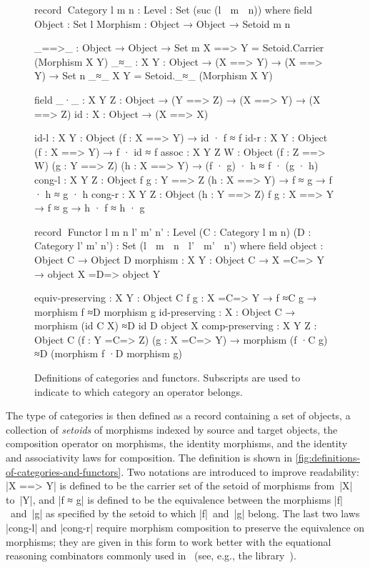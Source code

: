 \begin{figure}
\codefigure\small
\begin{code}
record ^^^Category {l m n : Level} : Set (suc (l ⊔ m ⊔ n)) where
  field
    Object    :  Set l
    Morphism  :  Object → Object → Setoid {m} {n}

  _==>_ : Object → Object → Set m
  X ==> Y = Setoid.Carrier (Morphism X Y)
  _≈_ : {X Y : Object} → (X ==> Y) → (X ==> Y) → Set n
  _≈_ {X} {Y} = Setoid._≈_ (Morphism X Y)

  field
    _·_  :   {X Y Z : Object} → (Y ==> Z) → (X ==> Y) → (X ==> Z)
    id   :   {X : Object} → (X ==> X)

    id-l    :  {X Y : Object} (f : X ==> Y) → id · f ≈ f
    id-r    :  {X Y : Object} (f : X ==> Y) → f · id ≈ f
    assoc   :  {X Y Z W : Object} (f : Z ==> W) (g : Y ==> Z) (h : X ==> Y) →
               (f · g) · h ≈ f · (g · h)
    cong-l  :  {X Y Z : Object} {f g : Y ==> Z} (h : X ==> Y) → f ≈ g → f · h ≈ g · h
    cong-r  :  {X Y Z : Object} (h : Y ==> Z) {f g : X ==> Y} → f ≈ g → h · f ≈ h · g

record ^^^Functor {l m n l' m' n' : Level}
  (C : Category {l} {m} {n}) (D : Category {l'} {m'} {n'}) :
  Set (l ⊔ m ⊔ n ⊔ l' ⊔ m' ⊔ n') where
  field
    object    :  Object C → Object D
    morphism  :  {X Y : Object C} → X =C=> Y → object X =D=> object Y

    equiv-preserving  :  {X Y : Object C} {f g : X =C=> Y} →
                         f ≈C g → morphism f ≈D morphism g
    id-preserving     :  {X : Object C} → morphism (id C {X}) ≈D id D {object X}
    comp-preserving   :  {X Y Z : Object C} (f : Y =C=> Z) (g : X =C=> Y) →
                         morphism (f ·C g) ≈D (morphism f ·D morphism g)
\end{code}
\caption{Definitions of categories and functors. Subscripts are used to indicate to which category an operator belongs.}
\label{fig:definitions-of-categories-and-functors}
\end{figure}

The type of categories is then defined as a record containing a set of objects, a collection of \emph{setoids} of morphisms indexed by source and target objects, the composition operator on morphisms, the identity morphisms, and the identity and associativity laws for composition.
The definition is shown in \autoref{fig:definitions-of-categories-and-functors}.
Two notations are introduced to improve readability: |X ==> Y| is defined to be the carrier set of the setoid of morphisms from~|X| to~|Y|, and |f ≈ g| is defined to be the equivalence between the morphisms |f|~and~|g| as specified by the setoid to which |f|~and~|g| belong.
The last two laws |cong-l| and |cong-r| require morphism composition to preserve the equivalence on morphisms; they are given in this form to work better with the equational reasoning combinators commonly used in \Agda\ (see, e.g., the  library~\citep{Mu-AoPA}).

